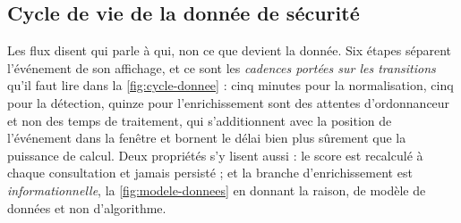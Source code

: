 \subsection{Cycle de vie de la donnée de sécurité}

Les flux disent qui parle à qui, non ce que devient la donnée. Six étapes séparent l'événement de
son affichage, et ce sont les \emph{cadences portées sur les transitions} qu'il faut lire dans la
\cref{fig:cycle-donnee} : cinq minutes pour la normalisation, cinq pour la détection, quinze pour
l'enrichissement sont des attentes d'ordonnanceur et non des temps de traitement, qui s'additionnent
avec la position de l'événement dans la fenêtre et bornent le délai bien plus sûrement que la
puissance de calcul. Deux propriétés s'y lisent aussi : le score est recalculé à chaque consultation
et jamais persisté ; et la branche d'enrichissement est \emph{informationnelle}, la
\cref{fig:modele-donnees} en donnant la raison, de modèle de données et non d'algorithme.

